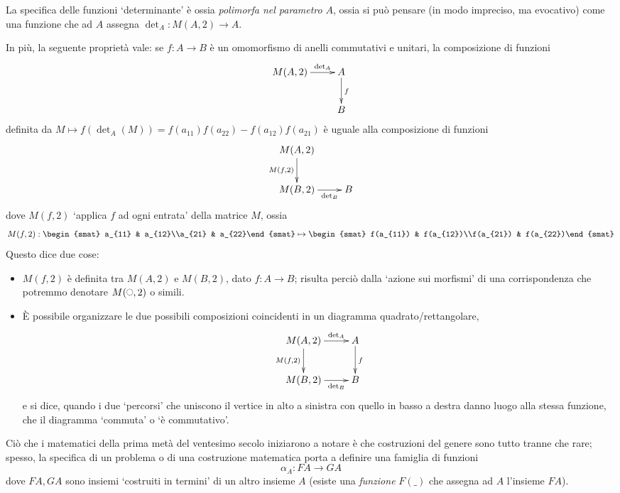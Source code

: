 La specifica delle funzioni `determinante' è ossia \emph{polimorfa nel parametro} \(A\), ossia si può pensare (in modo impreciso, ma evocativo) come una funzione che ad \(A\) assegna  \(\det_A : M(A,2) \to A\).

In più, la seguente proprietà vale: se \(f : A\to B\) è un omomorfismo di anelli commutativi e unitari, la composizione di funzioni
\[\xymatrix{
	M(A,2) \ar[r]^-{\det_A}& A\ar[d]^f \\
	& B
	}\]
definita da \(M\mapsto f(\det_A(M)) = f(a_{11})f(a_{22})-f(a_{12})f(a_{21})\) è uguale alla composizione di funzioni
\[\xymatrix{
	M(A,2) \ar[d]_{M(f,2)}&  \\
	M(B,2) \ar[r]_-{\det_B} & B
	}\] dove \(M(f,2)\) `applica \(f\) ad ogni entrata' della matrice \(M\), ossia
\[M(f,2) : \begin{smat} a_{11} & a_{12}\\a_{21} & a_{22}\end{smat} \mapsto \begin{smat} f(a_{11}) & f(a_{12})\\f(a_{21}) & f(a_{22})\end{smat}\]
Questo dice due cose:
\begin{itemize}
	\item \(M(f,2)\) è definita tra \(M(A,2)\) e \(M(B,2)\), dato \(f : A \to B\); risulta perciò dalla `azione sui morfismi' di una corrispondenza che potremmo denotare \(M(\blank,2)\) o simili.
	\item \`E possibile organizzare le due possibili composizioni coincidenti in un diagramma quadrato/rettangolare,
	      \[\xymatrix{
		      M(A,2) \ar[d]_{M(f,2)}\ar[r]^-{\det_A}& A\ar[d]^f \\
		      M(B,2) \ar[r]_-{\det_B} & B
		      }\]
	      e si dice, quando i due `percorsi' che uniscono il vertice in alto a sinistra con quello in basso a destra danno luogo alla stessa funzione, che il diagramma `commuta' o `è commutativo'.
\end{itemize}
Ciò che i matematici della prima metà del ventesimo secolo iniziarono a notare è che costruzioni del genere sono tutto tranne che rare; spesso, la specifica di un problema o di una costruzione matematica porta a definire una famiglia di funzioni
\[\alpha_A : FA \to GA \]
dove \(FA,GA\) sono insiemi `costruiti in termini' di un altro insieme \(A\) (esiste una \emph{funzione} \(F(\_)\) che assegna ad \(A\) l'insieme \(FA\)).

